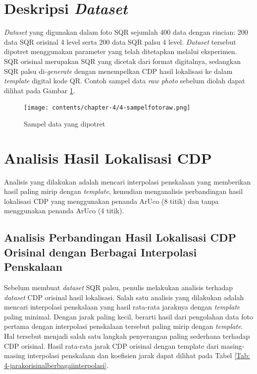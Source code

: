 \section{Deskripsi \emph{Dataset}}
\emph{Dataset} yang digunakan dalam foto SQR sejumlah 400 data dengan rincian: 200 data SQR orisinal 4 level serta 200 data SQR palsu 4 level. \emph{Dataset} tersebut dipotret menggunakan parameter yang telah ditetapkan melalui eksperimen. SQR orisinal merupakan SQR yang dicetak dari format digitalnya, sedangkan SQR palsu di-\emph{generate} dengan menempelkan CDP hasil lokalisasi ke dalam \emph{template} digital kode QR. Contoh sampel data \emph{raw photo} sebelum diolah dapat dilihat pada Gambar \ref{Fig: 4-sampelfotoraw}.

\begin{figure}[!h]
	\centering
	\texttt{[image: contents/chapter-4/4-sampelfotoraw.png]}
	\caption{Sampel data yang dipotret}
	\label{Fig: 4-sampelfotoraw}
\end{figure}

\section{Analisis Hasil Lokalisasi CDP}
Analisis yang dilakukan adalah mencari interpolasi penskalaan yang memberikan hasil paling mirip dengan \emph{template}, kemudian menganalisis perbandingan
hasil lokalisasi CDP yang menggunakan penanda ArUco (8 titik) dan tanpa menggunakan penanda ArUco (4 titik).
\subsection{Analisis Perbandingan Hasil Lokalisasi CDP Orisinal dengan Berbagai Interpolasi Penskalaan}
Sebelum membuat \emph{dataset} SQR palsu, penulis melakukan analisis terhadap \emph{dataset} CDP orisinal hasil lokalisasi. Salah satu analisis yang dilakukan
adalah mencari interpolasi penskalaan yang hasil rata-rata jaraknya dengan \emph{template} paling minimal. Dengan jarak paling kecil, berarti hasil dari
pengolahan data foto pertama dengan interpolasi penskalaan tersebut paling mirip dengan \emph{template}. Hal tersebut menjadi salah satu langkah penyerangan
paling sederhana terhadap CDP orisinal. Hasil rata-rata jarak CDP orisinal dengan template dari masing-masing interpolasi penskalaan dan koefisien jarak dapat
dilihat pada Tabel \ref{Tab: 4-jarakorisinalberbagaiinterpolasi}.

